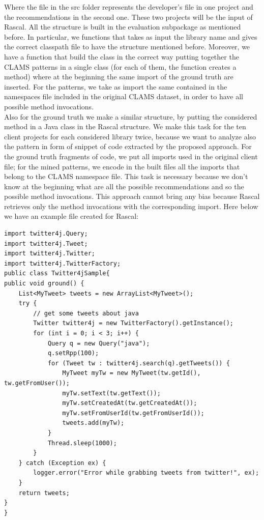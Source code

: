 Where the file in the src folder represents the developer's file in one project and the recommendations in the second one. These two projects will be the input of Rascal. All the structure is built in the evaluation subpackage as mentioned before. In particular, we functions that takes as input the library name and gives the correct classpath file to have the structure mentioned before. Moreover, we have a function that build the class in the correct way putting together the CLAMS patterns in a single class (for each of them, the function creates a method) where at the beginning the same import of the ground truth are inserted. For the patterns, we take as import the same contained in the namespaces file included in the original CLAMS dataset, in order to have all possible method invocations. \\
Also for the ground truth we make a similar structure, by putting the considered method in a Java class in the Rascal structure. We make this task for the ten client projects for each considered library twice, because we want to analyze also the pattern in form of snippet of code extracted by the proposed approach. For the ground truth fragments of code, we put all imports used in the original client file; for the mined patterns, we encode in the built files all the imports that belong to the CLAMS namespace file. This task is necessary because we don't know at the beginning what are all the possible recommendations and so the possible method invocations. This approach cannot bring any bias because Rascal retrieves only the method invocations with the corresponding import. Here below we have an example file created for Rascal:
\newpage
\begin{lstlisting}
import twitter4j.Query;
import twitter4j.Tweet;
import twitter4j.Twitter;
import twitter4j.TwitterFactory;
public class Twitter4jSample{
public void ground() {
    List<MyTweet> tweets = new ArrayList<MyTweet>();
    try {
        // get some tweets about java
        Twitter twitter4j = new TwitterFactory().getInstance();
        for (int i = 0; i < 3; i++) {
            Query q = new Query("java");
            q.setRpp(100);
            for (Tweet tw : twitter4j.search(q).getTweets()) {
                MyTweet myTw = new MyTweet(tw.getId(), tw.getFromUser());
                myTw.setText(tw.getText());
                myTw.setCreatedAt(tw.getCreatedAt());
                myTw.setFromUserId(tw.getFromUserId());
                tweets.add(myTw);
            }
            Thread.sleep(1000);
        }
    } catch (Exception ex) {
        logger.error("Error while grabbing tweets from twitter!", ex);
    }
    return tweets;
}
}
\end{lstlisting}
